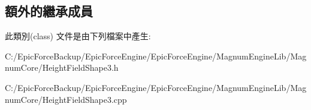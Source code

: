 \subsection*{額外的繼承成員}


此類別(class) 文件是由下列檔案中產生\+:\begin{DoxyCompactItemize}
\item 
C\+:/\+Epic\+Force\+Backup/\+Epic\+Force\+Engine/\+Epic\+Force\+Engine/\+Magnum\+Engine\+Lib/\+Magnum\+Core/Height\+Field\+Shape3.\+h\item 
C\+:/\+Epic\+Force\+Backup/\+Epic\+Force\+Engine/\+Epic\+Force\+Engine/\+Magnum\+Engine\+Lib/\+Magnum\+Core/Height\+Field\+Shape3.\+cpp\end{DoxyCompactItemize}
